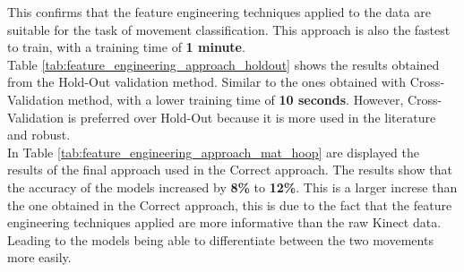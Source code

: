             This confirms that the feature engineering techniques applied to the data are suitable for the task of movement classification. This approach is  also the fastest to train, with a training time of \textbf{1 minute}. \\

            Table \ref{tab:feature_engineering_approach_holdout} shows the results obtained from the Hold-Out validation method. Similar to the ones obtained with Cross-Validation method, with a lower training time of \textbf{10 seconds}. However, Cross-Validation is preferred over Hold-Out because it is more used in the literature and robust.\\

            In Table \ref{tab:feature_engineering_approach_mat_hoop} are displayed the results of the final approach used in the Correct approach. The results show that the accuracy of the models increased by \textbf{8\%} to \textbf{12\%}. This is a larger increse than the one obtained in the Correct approach, this is due to the fact that the feature engineering techniques applied are more informative than the raw Kinect data. Leading to the models being able to differentiate between the two movements more easily. \\

